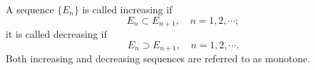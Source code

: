 A sequence $\{E_n\}$ is called increasing if
$$E_n \subset E_{n+1}, \quad n = 1, 2, \cdots;$$
it is called decreasing if
$$E_n \supset E_{n+1}, \quad n = 1, 2, \cdots.$$
Both increasing and decreasing sequences are referred to as monotone.
